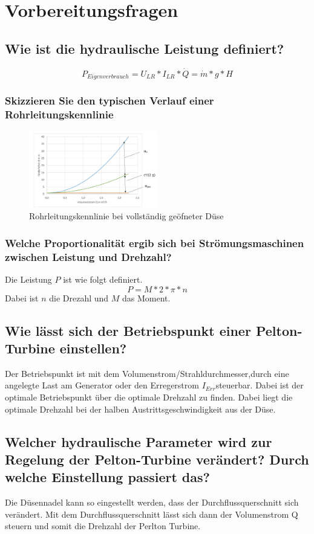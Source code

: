 \section{Vorbereitungsfragen}
\subsection{Wie ist die hydraulische Leistung definiert?}
%
\begin{equation}
	P_{ Eigenverbrauch }= U_{ LR} * I_{ LR }* \dot Q = \dot m * g* H
\label{eq:2}
\end{equation}
%
\subsubsection{Skizzieren Sie den typischen Verlauf einer Rohrleitungskennlinie}
%
\begin{figure}[!h]
		\centering
		\includegraphics[width=0.5\textwidth]{Abbildungen/Rohrleitungskennlinie}
		\caption{Rohrleitungskennlinie bei vollständig geöfneter Düse}
		\label{fig:Rohrleitungskennlinie}
\end{figure}
%
\subsubsection{Welche Proportionalität ergib sich bei Strömungsmaschinen zwischen Leistung und Drehzahl?}
Die Leistung $P$ ist wie folgt definiert.
%
\begin{equation}
	P= M*2*\pi*n
\label{eq:2}
\end{equation}
%
Dabei ist $n$ die Drezahl und $M$ das Moment.
\subsection{Wie lässt sich der Betriebspunkt einer Pelton-Turbine einstellen?}
Der Betriebspunkt ist mit dem Volumenstrom/Strahldurchmesser,durch eine angelegte Last am Generator oder den Erregerstrom $I_{Err}$steuerbar. Dabei ist der optimale Betriebspunkt über die optimale Drehzahl zu finden. Dabei liegt die optimale Drehzahl bei der halben Austrittsgeschwindigkeit aus der Düse.

\subsection{Welcher hydraulische Parameter wird zur Regelung der Pelton-Turbine verändert?
Durch welche Einstellung passiert das?}
Die Düsennadel kann so eingestellt werden, dass der Durchflussquerschnitt sich verändert. Mit dem Durchflussquerschnitt lässt sich dann der Volumenstrom Q steuern und somit die Drehzahl der Perlton Turbine.